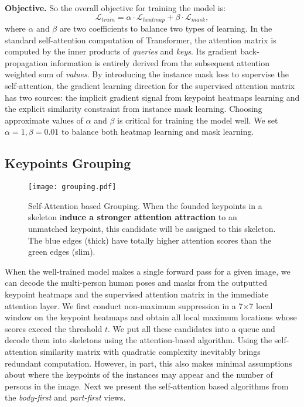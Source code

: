 \documentclass{article} \usepackage{iclr_conference,times}
\begin{document}
{\bf Objective.} So the overall objective for training the model is:
\begin{equation}
    \mathcal{L}_{train}=\alpha\cdot\mathcal{L}_{heatmap}+\beta\cdot\mathcal{L}_{mask},
\end{equation}
where $\alpha$ and $\beta$ are two coefficients to balance two types of learning. In the standard self-attention computation of Transformer, the attention matrix is computed by the inner products of \emph{queries} and \emph{keys}. Its gradient back-propagation information is entirely derived from the subsequent attention weighted sum of \emph{values}. 
By introducing the instance mask loss to supervise the self-attention, the gradient learning direction for the supervised attention matrix has two sources: the implicit gradient signal from keypoint heatmaps learning and the explicit similarity constraint from instance mask learning. Choosing approximate values of $\alpha$ and $\beta$ is critical for training the model well. We set $\alpha=1,\beta=0.01$ to balance both heatmap learning and mask learning.



\subsection{Keypoints Grouping}

\begin{wrapfigure}[17]{r}{8.5cm}\centering
\texttt{[image: grouping.pdf]}
\caption{Self-Attention based Grouping. When the founded keypoints in a skeleton i\textbf{nduce a stronger attention attraction} to an unmatched keypoint, this candidate will be assigned to this skeleton. The blue edges (thick) have totally higher attention scores than the green edges (slim).}
\label{fig:group}
\end{wrapfigure}

When the well-trained model makes a single forward pass for a given image, we can decode the multi-person human poses and masks from the outputted keypoint heatmaps and the supervised attention matrix in the immediate attention layer. 
We first conduct non-maximum suppression in a 7$\times$7 local window on the keypoint heatmaps and obtain all local maximum locations whose scores exceed the threshold $t$. We put all these candidates into a queue and decode them into skeletons using the attention-based algorithm. 
Using the self-attention similarity matrix with quadratic complexity inevitably brings redundant computation. However, in part, this also makes minimal assumptions about where the keypoints of the instances may appear and the number of persons in the image. 
Next we present the self-attention based algorithms from the \emph{body-first} and \emph{part-first} views.
\end{document}
